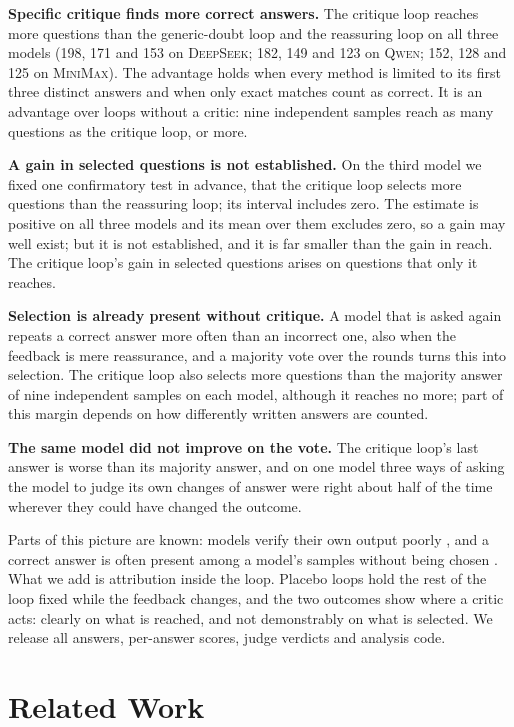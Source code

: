 \documentclass[11pt]{article}
\newcommand{\ds}{\textsc{DeepSeek}}
\newcommand{\qw}{\textsc{Qwen}}
\newcommand{\mm}{\textsc{MiniMax}}
\begin{document}
\textbf{Specific critique finds more correct answers.}
The critique loop reaches more questions than the generic-doubt loop and the reassuring loop on all three models (198, 171 and 153 on \ds; 182, 149 and 123 on \qw; 152, 128 and 125 on \mm).
The advantage holds when every method is limited to its first three distinct answers and when only exact matches count as correct.
It is an advantage over loops without a critic: nine independent samples reach as many questions as the critique loop, or more.

\textbf{A gain in selected questions is not established.}
On the third model we fixed one confirmatory test in advance, that the critique loop selects more questions than the reassuring loop; its interval includes zero.
The estimate is positive on all three models and its mean over them excludes zero, so a gain may well exist; but it is not established, and it is far smaller than the gain in reach.
The critique loop's gain in selected questions arises on questions that only it reaches.

\textbf{Selection is already present without critique.}
A model that is asked again repeats a correct answer more often than an incorrect one, also when the feedback is mere reassurance, and a majority vote over the rounds turns this into selection.
The critique loop also selects more questions than the majority answer of nine independent samples on each model, although it reaches no more; part of this margin depends on how differently written answers are counted.

\textbf{The same model did not improve on the vote.}
The critique loop's last answer is worse than its majority answer, and on one model three ways of asking the model to judge its own changes of answer were right about half of the time wherever they could have changed the outcome.

Parts of this picture are known: models verify their own output poorly \citep{huang2024cannot,stechly2024selfverification,song2024mindgap}, and a correct answer is often present among a model's samples without being chosen \citep{brown2024monkeys,jain2026cliff}.
What we add is attribution inside the loop.
Placebo loops hold the rest of the loop fixed while the feedback changes, and the two outcomes show where a critic acts: clearly on what is reached, and not demonstrably on what is selected.
We release all answers, per-answer scores, judge verdicts and analysis code.

\section{Related Work}
\end{document}
